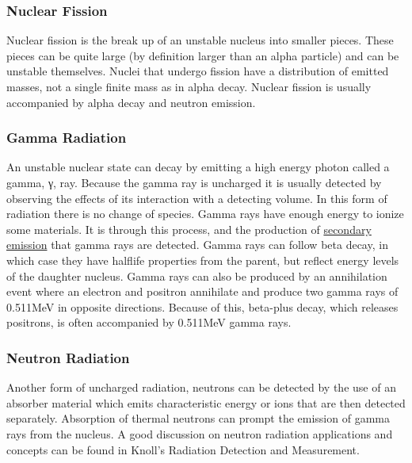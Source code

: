 \documentclass[12pt]{article}
\begin{document}
\begin{doublespacing}
\subsubsection{Nuclear Fission}
Nuclear fission is the break up of an unstable nucleus into smaller pieces. These pieces can be quite large (by definition larger than an alpha particle) and can be unstable themselves. Nuclei that undergo fission have a distribution of emitted masses, not a single finite mass as in alpha decay. Nuclear fission is usually accompanied by alpha decay and neutron emission.

\subsubsection{Gamma Radiation}
An unstable nuclear state can decay by emitting a high energy photon called a gamma, γ, ray. Because the gamma ray is uncharged it is usually detected by observing the effects of its interaction with a detecting volume. In this form of radiation there is no change of species. 
Gamma rays have enough energy to ionize some materials. It is through this process, and the production of \href{https://en.wikipedia.org/wiki/Secondary_emmission}{secondary emission} that gamma rays are detected. Gamma rays can follow beta decay, in which case they have halflife properties from the parent, but reflect energy levels of the daughter nucleus.
Gamma rays can also be produced by an annihilation event where an electron and positron annihilate and produce two gamma rays of 0.511MeV in opposite directions. Because of this, beta-plus decay, which releases positrons, is often accompanied by 0.511MeV gamma rays.

\subsubsection{Neutron Radiation}
Another form of uncharged radiation, neutrons can be detected by the use of an absorber material which emits characteristic energy or ions that are then detected separately.
Absorption of thermal neutrons can prompt the emission of gamma rays from the nucleus.
A good discussion on neutron radiation applications and concepts can be found in Knoll's Radiation Detection and Measurement.


\end{doublespacing}
\end{document}
